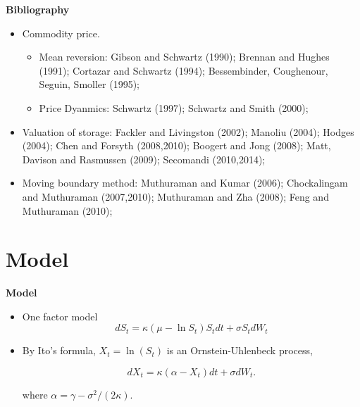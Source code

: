 \documentclass{beamer}
\begin{document}
\begin{frame}
{\bf Bibliography}

\begin{itemize}
  \item Commodity price.
      \begin{itemize}
      \item Mean reversion:  Gibson and Schwartz (1990); Brennan and Hughes (1991); Cortazar and Schwartz (1994); Bessembinder, Coughenour, Seguin, Smoller (1995);
      \item Price Dyanmics: Schwartz (1997); Schwartz and Smith (2000);
      \end{itemize}
  \item Valuation of storage: \small{Fackler and Livingston (2002); Manoliu (2004); Hodges (2004); Chen and Forsyth (2008,2010); Boogert and Jong (2008); Matt, Davison and Rasmussen (2009); Secomandi (2010,2014); }
  
  \item Moving boundary method: \small{Muthuraman and Kumar (2006); Chockalingam and Muthuraman (2007,2010); Muthuraman and Zha (2008); Feng and Muthuraman (2010); }
\end{itemize}

\end{frame}


\section{Model}
\begin{frame}
{\bf Model}
\begin{itemize}
  \item One factor model
\begin{equation*}
  dS_t = \kappa ( \mu - \ln S_t)S_t dt + \sigma S_t dW_t
\end{equation*}
\item By Ito's formula, $X_t = \ln(S_t)$ is an Ornstein-Uhlenbeck process,

\begin{equation*}
  dX_t = \kappa ( \alpha - X_t) dt + \sigma dW_t.
\end{equation*}

where $\alpha  = \gamma - \sigma^2/(2\kappa)$.
\end{itemize}

\end{frame}
\end{document}
